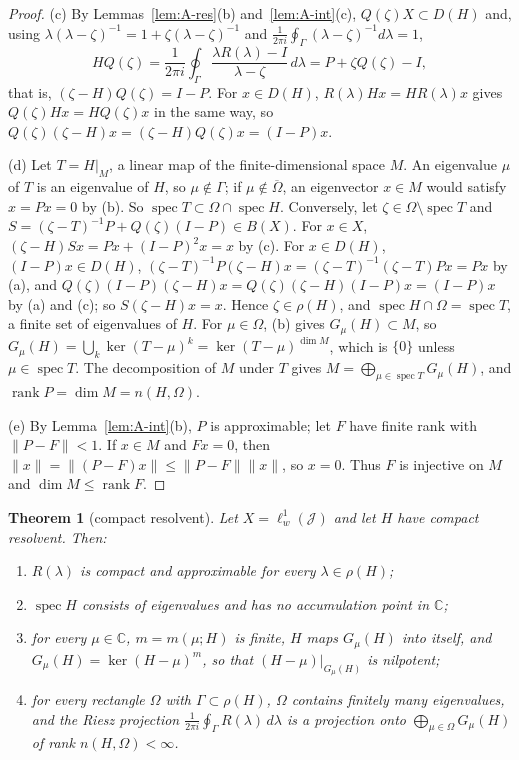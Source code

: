 \documentclass[11pt]{article}
\newtheorem{thmx}[lemma]{Theorem}
\theoremstyle{definition}
\newcommand{\C}{\mathbb{C}}
\newcommand{\spec}{\operatorname{spec}}
\newcommand{\rank}{\operatorname{rank}}
\begin{document}
\begin{proof}
(c) By Lemmas~\ref{lem:A-res}(b) and~\ref{lem:A-int}(c), $Q(\zeta)X \subset D(H)$ and, using $\lambda(\lambda - \zeta)^{-1} = 1 + \zeta(\lambda - \zeta)^{-1}$ and $\frac{1}{2\pi i}\oint_\Gamma(\lambda - \zeta)^{-1}d\lambda = 1$,
\[ HQ(\zeta) = \frac{1}{2\pi i}\oint_\Gamma\frac{\lambda R(\lambda) - I}{\lambda - \zeta}\,d\lambda = P + \zeta Q(\zeta) - I, \]
that is, $(\zeta - H)Q(\zeta) = I - P$. For $x \in D(H)$, $R(\lambda)Hx = HR(\lambda)x$ gives $Q(\zeta)Hx = HQ(\zeta)x$ in the same way, so $Q(\zeta)(\zeta - H)x = (\zeta - H)Q(\zeta)x = (I - P)x$.

(d) Let $T = H|_M$, a linear map of the finite-dimensional space $M$. An eigenvalue $\mu$ of $T$ is an eigenvalue of $H$, so $\mu \notin \Gamma$; if $\mu \notin \overline\Omega$, an eigenvector $x \in M$ would satisfy $x = Px = 0$ by (b). So $\spec T \subset \Omega \cap \spec H$. Conversely, let $\zeta \in \Omega\setminus\spec T$ and $S = (\zeta - T)^{-1}P + Q(\zeta)(I - P) \in B(X)$. For $x \in X$, $(\zeta - H)Sx = Px + (I - P)^2x = x$ by (c). For $x \in D(H)$, $(I - P)x \in D(H)$, $(\zeta - T)^{-1}P(\zeta - H)x = (\zeta - T)^{-1}(\zeta - T)Px = Px$ by (a), and $Q(\zeta)(I - P)(\zeta - H)x = Q(\zeta)(\zeta - H)(I - P)x = (I - P)x$ by (a) and (c); so $S(\zeta - H)x = x$. Hence $\zeta \in \rho(H)$, and $\spec H \cap \Omega = \spec T$, a finite set of eigenvalues of $H$. For $\mu \in \Omega$, (b) gives $G_\mu(H) \subset M$, so $G_\mu(H) = \bigcup_k\ker(T - \mu)^k = \ker(T - \mu)^{\dim M}$, which is $\{0\}$ unless $\mu \in \spec T$. The decomposition of $M$ under $T$ gives $M = \bigoplus_{\mu\in\spec T}G_\mu(H)$, and $\rank P = \dim M = n(H, \Omega)$.

(e) By Lemma~\ref{lem:A-int}(b), $P$ is approximable; let $F$ have finite rank with $\|P - F\| < 1$. If $x \in M$ and $Fx = 0$, then $\|x\| = \|(P - F)x\| \le \|P - F\|\|x\|$, so $x = 0$. Thus $F$ is injective on $M$ and $\dim M \le \rank F$.
\end{proof}

\begin{thmx}[compact resolvent]\label{thm:A-compact}
Let $X = \ell^1_w(\mathcal J)$ and let $H$ have compact resolvent. Then:
\begin{enumerate}
\item[(i)] $R(\lambda)$ is compact and approximable for every $\lambda \in \rho(H)$;
\item[(ii)] $\spec H$ consists of eigenvalues and has no accumulation point in $\C$;
\item[(iii)] for every $\mu \in \C$, $m = m(\mu; H)$ is finite, $H$ maps $G_\mu(H)$ into itself, and $G_\mu(H) = \ker(H - \mu)^m$, so that $(H - \mu)|_{G_\mu(H)}$ is nilpotent;
\item[(iv)] for every rectangle $\Omega$ with $\Gamma \subset \rho(H)$, $\Omega$ contains finitely many eigenvalues, and the Riesz projection $\frac{1}{2\pi i}\oint_\Gamma R(\lambda)\,d\lambda$ is a projection onto $\bigoplus_{\mu\in\Omega}G_\mu(H)$ of rank $n(H, \Omega) < \infty$.
\end{enumerate}
\end{thmx}
\end{document}
